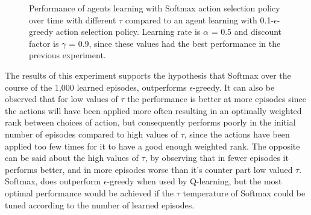 \documentclass[11pt]{article}
\begin{document}
\begin{center}
\begin{figure}
\caption{Performance of agents learning with Softmax action selection policy over time with different $\tau$ compared to an agent learning with 0.1-$\epsilon$-greedy action selection policy. Learning rate is $\alpha$ = 0.5 and discount factor is $\gamma$ = 0.9, since these values had the best performance in the previous experiment.}
\label{Exp3}
\end{figure}
\end{center}

The results of this experiment supports the hypothesis that Softmax over the course of the 1,000 learned episodes, outperforms $\epsilon$-greedy. It can also be observed that for low values of $\tau$ the performance is better at more episodes since the actions will have been applied more often resulting in an optimally weighted rank between choices of action, but consequently performs poorly in the initial number of episodes compared to high values of $\tau$, since the actions have been applied too few times for it to have a good enough weighted rank. The opposite can be said about the high values of $\tau$, by observing that in fewer episodes it performs better, and in more episodes worse than it's counter part low valued $\tau$.\\
Softmax, does outperform $\epsilon$-greedy when used by Q-learning, but the most optimal performance would be achieved if the $\tau$ temperature of Softmax could be tuned according to the number of learned episodes.
\end{document}
